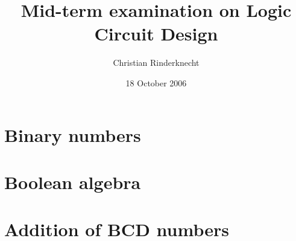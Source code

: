 \documentclass[11pt,a4paper]{article}
\title{Mid-term examination on Logic Circuit Design}
\author{Christian Rinderknecht}
\date{18 October 2006}
\begin{document}
\maketitle
\thispagestyle{empty}

\section{Binary numbers}




\section{Boolean algebra}







\section{Addition of BCD numbers}



\end{document}
